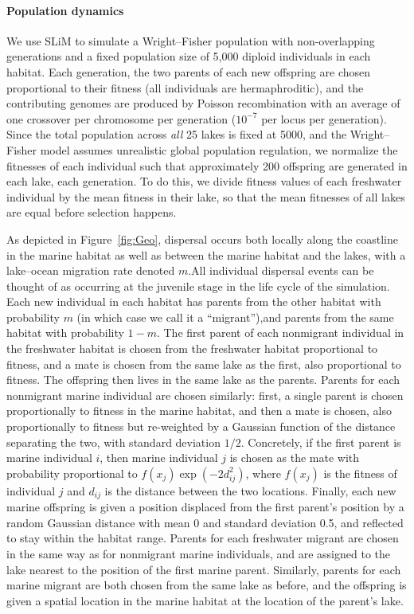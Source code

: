 \documentclass{article}
\begin{document}
\paragraph{Population dynamics}

We use SLiM to simulate a Wright--Fisher population with non-overlapping generations and a fixed population size of 5,000 diploid individuals in each habitat. Each generation, the two parents of each new offspring are chosen proportional to their fitness (all individuals are hermaphroditic), and the contributing genomes are produced by Poisson recombination with an average of one crossover per chromosome per generation ($10^{-7}$ per locus per generation). Since the total population across \emph{all} 25 lakes is fixed at 5000, and the Wright--Fisher model assumes unrealistic global population regulation, we normalize the fitnesses of each individual such that approximately 200 offspring are generated in each lake, each generation. To do this, we divide fitness values of each freshwater individual by the mean fitness in their lake, so that the mean fitnesses of all lakes are equal before selection happens.

As depicted in Figure~\ref{fig:Geo}, dispersal occurs both locally along the coastline in the marine habitat as well as between the marine habitat and the lakes,
with a lake--ocean migration rate denoted $m$.All individual dispersal events can be thought of as occurring at the juvenile stage in the life cycle of the simulation. 
Each new individual in each habitat has parents from the other habitat with probability $m$ (in which case we call it a ``migrant''),and parents from the same habitat with probability $1-m$.
The first parent of each nonmigrant individual in the freshwater habitat is chosen from the freshwater habitat proportional to fitness, and a mate is chosen from the same lake as the first, also proportional to fitness. The offspring then lives in the same lake as the parents. Parents for each nonmigrant marine individual are chosen similarly:
first, a single parent is chosen proportionally to fitness in the marine habitat, and then a mate is chosen, also proportionally to fitness but re-weighted by a Gaussian function of the distance separating the two, with standard deviation $1/2$. Concretely, if the first parent is marine individual $i$, then marine individual $j$ is chosen as the mate with probability proportional to $f(x_j) \exp(-2d_{ij}^2)$, where $f(x_j)$ is the fitness of individual $j$ and $d_{ij}$ is the distance between the two locations. 
Finally, each new marine offspring is given a position displaced from the first parent's position by a random Gaussian distance with mean 0 and standard deviation 0.5, and reflected to stay within the habitat range.
Parents for each freshwater migrant are chosen in the same way as for nonmigrant marine individuals, and are assigned to the lake nearest to the position of the first marine parent. Similarly, parents for each marine migrant are both chosen from the same lake as before, and the offspring is given a spatial location in the marine habitat at the location of the parent's lake. 
\end{document}
